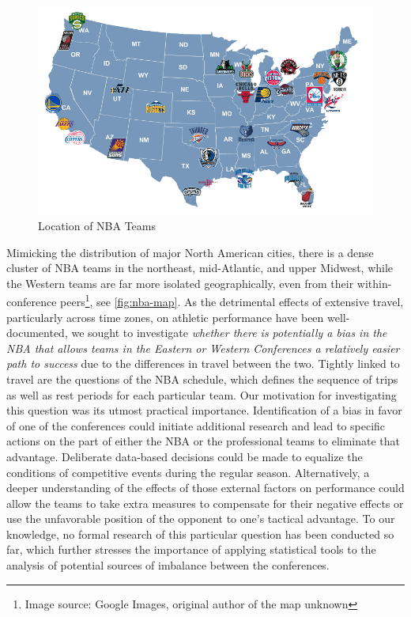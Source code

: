 \documentclass[
    12pt,
    a4paper,
    titlepage,  %
    abstract,  %
    headings=standardclasses,  %
    bibliography=totocnumbered  %
]{scrartcl}
\begin{document}
\begin{figure}[ht]
    \centering
    \includegraphics[width=\linewidth]{nba-map}
    \caption{Location of NBA Teams}
    \label{fig:nba-map}
\end{figure}

Mimicking the distribution of major North American cities, there is a dense cluster of NBA teams in the northeast, mid-Atlantic, and upper Midwest, while the Western teams are far more isolated geographically, even from their within-conference peers\footnote{Image source: Google Images, original author of the map unknown}, see \autoref{fig:nba-map}. As the detrimental effects of extensive travel, particularly across time zones, on athletic performance have been well-documented, we sought to investigate \emph{whether there is potentially a bias in the NBA that allows teams in the Eastern or Western Conferences a relatively easier path to success} due to the differences in travel between the two. Tightly linked to travel are the questions of the NBA schedule, which defines the sequence of trips as well as rest periods for each particular team. Our motivation for investigating this question was its utmost practical importance. Identification of a bias in favor of one of the conferences could initiate additional research and lead to specific actions on the part of either the NBA or the professional teams to eliminate that advantage. Deliberate data-based decisions could be made to equalize the conditions of competitive events during the regular season. Alternatively, a deeper understanding of the effects of those external factors on performance could allow the teams to take extra measures to compensate for their negative effects or use the unfavorable position of the opponent to one's tactical advantage. To our knowledge, no formal research of this particular question has been conducted so far, which further stresses the importance of applying statistical tools to the analysis of potential sources of imbalance between the conferences.
\end{document}
